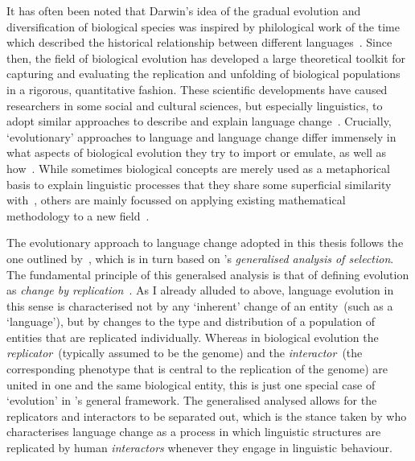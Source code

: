 It has often been noted that Darwin's idea of the gradual evolution and diversification of biological species was inspired by philological work of the time which described the historical relationship between different languages~\citep{Darwin1871}. Since then, the field of biological evolution has developed a large theoretical toolkit for capturing and evaluating the replication and unfolding of biological populations in a rigorous, quantitative fashion. These scientific developments %
have caused researchers in some social and cultural sciences, but especially linguistics, to adopt similar approaches to describe and explain language change~\citep[to list just a few monographs]{Croft2000,Ritt2004,McMahon2005}.
Crucially, `evolutionary' approaches to language and language change differ immensely in what aspects of biological evolution they try to import or emulate, as well as how~\citep{Croft2000}. While sometimes biological concepts are merely used as a metaphorical basis to explain linguistic processes that they share some superficial similarity with~\citep[e.g.][]{Lass1990}, others are mainly focussed on applying existing mathematical methodology to a new field~\citep{BorgerhoffMulder2001,Atkinson2005a,Jager2008,Castellano2009}.

The evolutionary approach to language change adopted in this thesis follows the one outlined by~\citet{Croft2000}, which is in turn based on \citeauthor{Hull1988}'s \emph{generalised analysis of selection}. The fundamental principle of this generalsed analysis is that of defining evolution as \emph{change by replication}~\citep[p.410]{Hull1988}. As I already alluded to above, language evolution in this sense is characterised not by any `inherent' change of an entity~(such as a `language'), but by changes to the type and distribution of a population of entities that are replicated individually. %
Whereas in biological evolution the \emph{replicator}~(typically assumed to be the genome) and the \emph{interactor}~(the corresponding phenotype that is central to the replication of the genome) are united in one and the same biological entity, this is just one special case of `evolution' in \citeauthor{Hull1988}'s general framework. The generalised analysed allows for the replicators and interactors to be separated out, which is the stance taken by \citet{Croft2000} who characterises language change as a process in which linguistic structures are replicated by human \emph{interactors} whenever they engage in linguistic behaviour.

